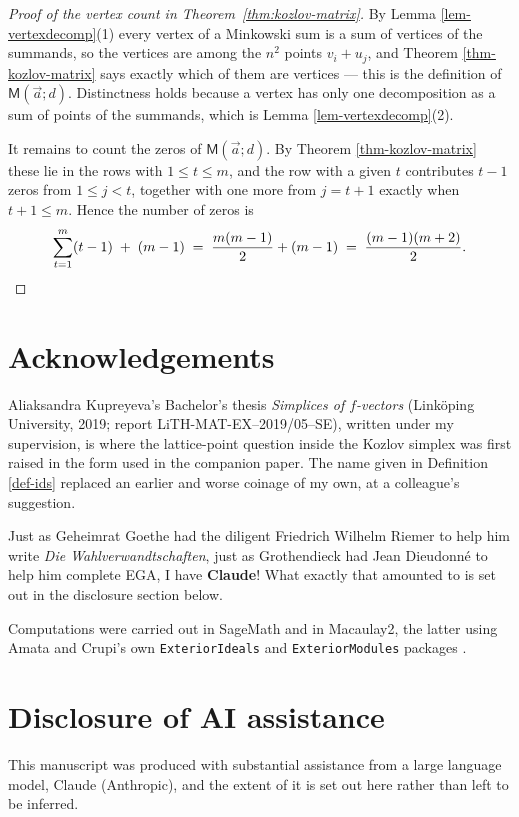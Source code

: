\documentclass[11pt, a4paper, abstract=yes]{scrartcl}
\theoremstyle{definition}
\theoremstyle{remark}
\theoremstyle{plain}
\newcommand{\extten}{\mathsf{M}}
\let\autocite\cite
\begin{document}
\begin{proof}[Proof of the vertex count in Theorem~\ref{thm:kozlov-matrix}]
By Lemma \ref{lem-vertexdecomp}(1) every vertex of a Minkowski sum is a sum of vertices of the summands,
so the vertices are among the \(n^2\) points \(v_i+u_j\), and
Theorem \ref{thm-kozlov-matrix} says exactly which of them are vertices --- this is the definition of
\(\extten(\vec a;d)\). Distinctness holds because a vertex has only one decomposition as a sum of
points of the summands, which is Lemma \ref{lem-vertexdecomp}(2).

It remains to count the zeros of \(\extten(\vec a;d)\). By Theorem \ref{thm-kozlov-matrix} these lie in
the rows with \(1\le t\le m\), and the row with a given \(t\) contributes \(t-1\) zeros from
\(1\le j<t\), together with one more from \(j=t+1\) exactly when \(t+1\le m\). Hence the number of
zeros is
\begin{equation}\label{eq:gapK-6}
  \sum_{t=1}^{m}(t-1)\;+\;(m-1)\;=\;\frac{m(m-1)}{2}+(m-1)\;=\;\frac{(m-1)(m+2)}{2}. \qedhere
\end{equation}
\end{proof}
\section*{Acknowledgements}
\label{sec:org4bf81a9}
Aliaksandra Kupreyeva's Bachelor's thesis \emph{Simplices of \(f\)-vectors} (Linköping University, 2019;
report LiTH-MAT-EX--2019/05--SE), written under my supervision, is where the lattice-point question
inside the Kozlov simplex was first raised in the form used in the companion paper. The name given in
Definition \ref{def-ids} replaced an earlier and worse coinage of my own, at a colleague's suggestion.

Just as Geheimrat Goethe had the diligent Friedrich Wilhelm Riemer to help him write \emph{Die
Wahlverwandtschaften}, just as Grothendieck had Jean Dieudonné to help him complete EGA, I have
\textbf{Claude}! What exactly that amounted to is set out in the disclosure section below.

Computations were carried out in SageMath and in Macaulay2, the latter using
Amata and Crupi's own \texttt{ExteriorIdeals} and \texttt{ExteriorModules} packages
\autocite{AmataCrupi2018ExteriorIdeals,AmataCrupi2021,Macaulay2,SageMath}.
\section*{Disclosure of AI assistance}
\label{sec:org745ef0a}
This manuscript was produced with substantial assistance from a large language model, Claude
(Anthropic), and the extent of it is set out here rather than left to be inferred.
\end{document}
